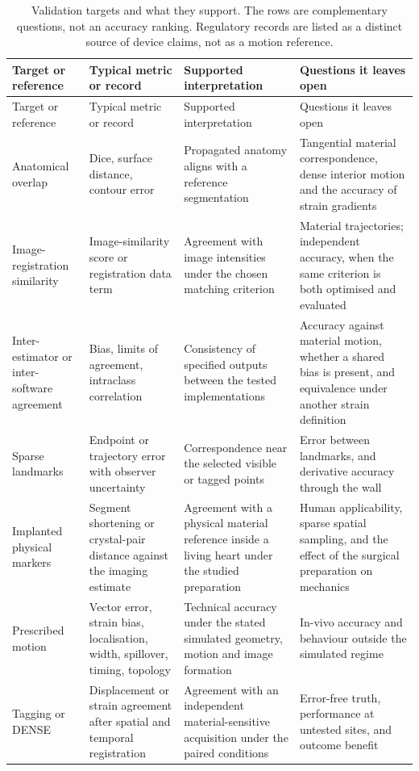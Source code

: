 \begin{longtable}{@{}L{0.16\textwidth}L{0.20\textwidth}L{0.26\textwidth}L{0.29\textwidth}@{}}
\caption{Validation targets and what they support. The rows are complementary questions, not an
accuracy ranking. Regulatory records are listed as a distinct source of device claims, not as a
motion reference.}\label{tab:targets}\\
\toprule
Target or reference & Typical metric or record & Supported interpretation & Questions it leaves open\\
\midrule
\endfirsthead
\toprule
Target or reference & Typical metric or record & Supported interpretation & Questions it leaves open\\
\midrule
\endhead
Anatomical overlap & Dice, surface distance, contour error & Propagated anatomy aligns with a reference segmentation & Tangential material correspondence, dense interior motion and the accuracy of strain gradients\\
Image-registration similarity & Image-similarity score or registration data term & Agreement with image intensities under the chosen matching criterion & Material trajectories; independent accuracy, when the same criterion is both optimised and evaluated\\
Inter-estimator or inter-software agreement & Bias, limits of agreement, intraclass correlation & Consistency of specified outputs between the tested implementations & Accuracy against material motion, whether a shared bias is present, and equivalence under another strain definition\\
Sparse landmarks & Endpoint or trajectory error with observer uncertainty & Correspondence near the selected visible or tagged points & Error between landmarks, and derivative accuracy through the wall\\
Implanted physical markers & Segment shortening or crystal-pair distance against the imaging estimate & Agreement with a physical material reference inside a living heart under the studied preparation & Human applicability, sparse spatial sampling, and the effect of the surgical preparation on mechanics\\
Prescribed motion & Vector error, strain bias, localisation, width, spillover, timing, topology & Technical accuracy under the stated simulated geometry, motion and image formation & In-vivo accuracy and behaviour outside the simulated regime\\
Tagging or DENSE & Displacement or strain agreement after spatial and temporal registration & Agreement with an independent material-sensitive acquisition under the paired conditions & Error-free truth, performance at untested sites, and outcome benefit\\

\end{longtable}
